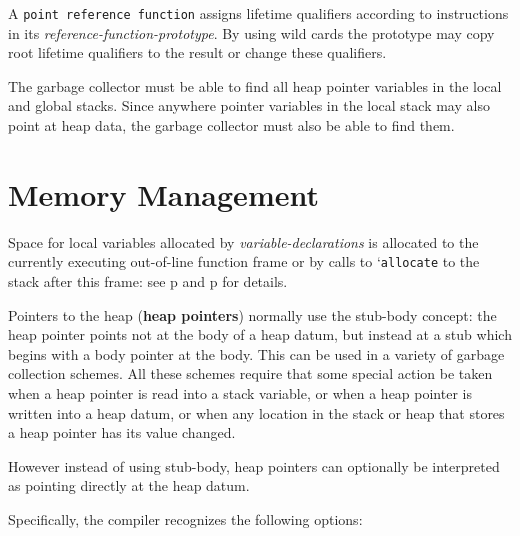 \documentclass[12pt]{article}
\newcommand{\skey}[2]{{\rm \bfseries #1#2}}
\newcommand{\pagref}[1]{p\pageref{#1}}
\begin{document}
A {\tt point reference function} assigns lifetime qualifiers according
to instructions in its {\em reference-function-prototype}.  By using
wild cards the prototype may copy root lifetime qualifiers to the
result or change these qualifiers.

The garbage collector must be able to find all heap pointer variables
in the local and global stacks.  Since anywhere pointer variables in
the local stack may also point at heap data, the garbage collector
must also be able to find them.


\section{Memory Management}
\label{MEMORY-MANAGEMENT}

Space for local variables allocated by {\em variable-declarations}
is allocated to the currently executing out-of-line function
frame or by calls to `{\tt allocate} to the stack after this frame: see
\pagref{VARIABLE-ALLOCATION} and \pagref{LOOP-ALLOCATION}
for details.

Pointers to the heap (\skey{heap pointer}s) normally use the stub-body concept:
the heap pointer points not at the body of a heap datum, but instead at a
stub which begins with a body pointer at the body.  This can be
used in a variety of garbage collection schemes.  All these
schemes require that some special action be taken when a heap
pointer is read into a stack variable, or when
a heap pointer is written into a heap datum, or when any location
in the stack or heap that stores a heap pointer has its value
changed.

However instead of using stub-body, heap pointers can optionally be
interpreted as pointing directly at the heap datum.

Specifically, the compiler recognizes the following options:
\end{document}
